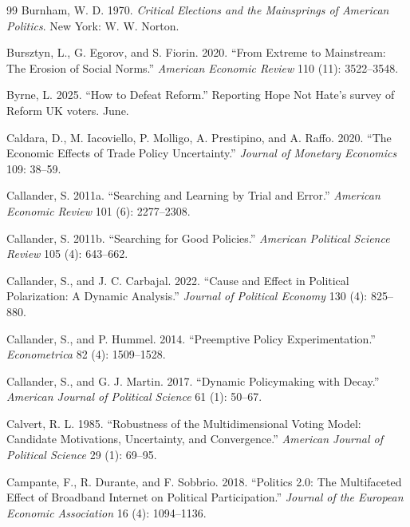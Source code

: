 \documentclass[12pt,letterpaper]{article}
\begin{document}
\begin{thebibliography}{99}
Burnham, W. D. 1970. \textit{Critical Elections and the Mainsprings of American Politics}. New York: W. W. Norton.

Bursztyn, L., G. Egorov, and S. Fiorin. 2020. ``From Extreme to Mainstream: The Erosion of Social Norms.'' \textit{American Economic Review} 110 (11): 3522--3548.

Byrne, L. 2025. ``How to Defeat Reform.'' Reporting Hope Not Hate's survey of Reform UK voters. June.

Caldara, D., M. Iacoviello, P. Molligo, A. Prestipino, and A. Raffo. 2020. ``The Economic Effects of Trade Policy Uncertainty.'' \textit{Journal of Monetary Economics} 109: 38--59.

Callander, S. 2011a. ``Searching and Learning by Trial and Error.'' \textit{American Economic Review} 101 (6): 2277--2308.

Callander, S. 2011b. ``Searching for Good Policies.'' \textit{American Political Science Review} 105 (4): 643--662.

Callander, S., and J. C. Carbajal. 2022. ``Cause and Effect in Political Polarization: A Dynamic Analysis.'' \textit{Journal of Political Economy} 130 (4): 825--880.

Callander, S., and P. Hummel. 2014. ``Preemptive Policy Experimentation.'' \textit{Econometrica} 82 (4): 1509--1528.

Callander, S., and G. J. Martin. 2017. ``Dynamic Policymaking with Decay.'' \textit{American Journal of Political Science} 61 (1): 50--67.

Calvert, R. L. 1985. ``Robustness of the Multidimensional Voting Model: Candidate Motivations, Uncertainty, and Convergence.'' \textit{American Journal of Political Science} 29 (1): 69--95.

Campante, F., R. Durante, and F. Sobbrio. 2018. ``Politics 2.0: The Multifaceted Effect of Broadband Internet on Political Participation.'' \textit{Journal of the European Economic Association} 16 (4): 1094--1136.


\end{thebibliography}
\end{document}
